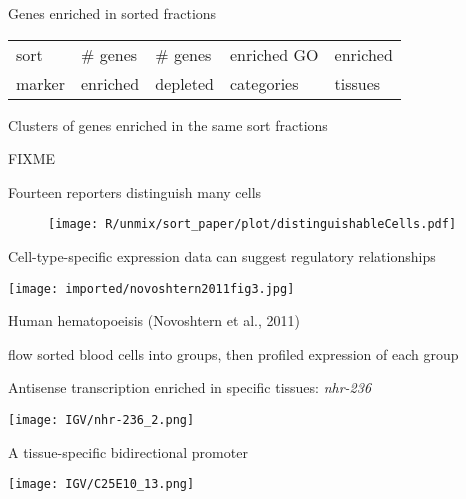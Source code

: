 \documentclass[serif,9pt]{beamer}
\begin{document}
\begin{frame}{Genes enriched in sorted fractions}

\begin{table}\footnotesize
\begin{tabular}{lllll}
sort & \# genes & \# genes & enriched GO & enriched \\
marker & enriched & depleted & categories & tissues \\
\hline
\end{tabular}
\end{table}

\end{frame}


\begin{frame}{Clusters of genes enriched in the same sort fractions}

FIXME


\end{frame}

\begin{frame}{Fourteen reporters distinguish many cells}

\begin{figure}
\begin{centering}
\texttt{[image: R/unmix/sort\_paper/plot/distinguishableCells.pdf]}

\end{centering}
\end{figure}

\end{frame}

\begin{frame}{Cell-type-specific expression data can suggest regulatory relationships}

\texttt{[image: imported/novoshtern2011fig3.jpg]}

Human hematopoeisis (Novoshtern et al., 2011)

{\small flow sorted blood cells into groups, then profiled expression of each group}

\end{frame}


\begin{frame}{Antisense transcription enriched in specific tissues: {\em nhr-236}}

\texttt{[image: IGV/nhr-236\_2.png]}

\end{frame}

\begin{frame}{A tissue-specific bidirectional promoter}

\texttt{[image: IGV/C25E10\_13.png]}

\end{frame}
\end{document}
